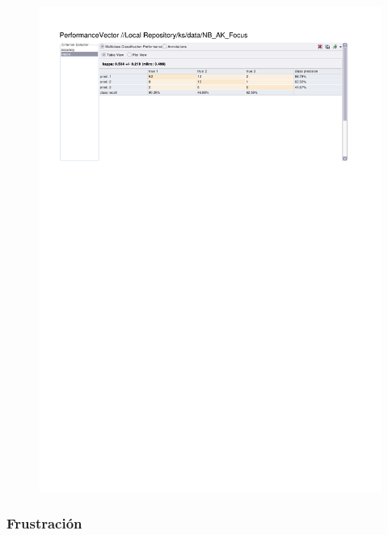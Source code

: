 \begin{figure}[htp]
  \centerline{\includegraphics[trim=0 680 0 60,clip,width=16.09cm]{results/NB_K_Focus.pdf}} \caption{
} \label{NB_K_Focus}
\end{figure}

\clearpage
\FloatBarrier
\subsubsection{Frustración}

